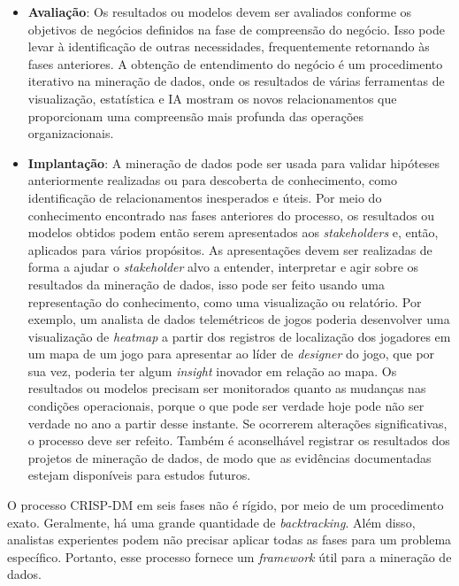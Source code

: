 \begin{itemize}
  \item
\textbf{Avaliação}: Os resultados ou modelos devem ser avaliados conforme os objetivos de negócios definidos na fase de compreensão do negócio. Isso pode levar à identificação de outras necessidades, frequentemente retornando às fases anteriores. A obtenção de entendimento do negócio é um procedimento iterativo na mineração de dados, onde os resultados de várias ferramentas de visualização, estatística e IA mostram os novos relacionamentos que proporcionam uma compreensão mais profunda das operações organizacionais.
  \item
\textbf{Implantação}: A mineração de dados pode ser usada para validar hipóteses anteriormente realizadas ou para descoberta de conhecimento, como identificação de relacionamentos inesperados e úteis. Por meio do conhecimento encontrado nas fases anteriores do processo, os resultados ou modelos obtidos podem então serem apresentados aos \textit{stakeholders} e, então, aplicados para vários propósitos. As apresentações devem ser realizadas de forma a ajudar o \textit{stakeholder} alvo a entender, interpretar e agir sobre os resultados da mineração de dados, isso pode ser feito usando uma representação do conhecimento, como uma visualização ou relatório. Por exemplo, um analista de dados telemétricos de jogos poderia desenvolver uma visualização de \textit{heatmap} a partir dos registros de localização dos jogadores em um mapa de um jogo para apresentar ao líder de \textit{designer} do jogo, que por sua vez, poderia ter algum \textit{insight} inovador em relação ao mapa. Os resultados ou modelos precisam ser monitorados quanto as mudanças nas condições operacionais, porque o que pode ser verdade hoje pode não ser verdade no ano a partir desse instante. Se ocorrerem alterações significativas, o processo deve ser refeito. Também é aconselhável registrar os resultados dos projetos de mineração de dados, de modo que as evidências documentadas estejam disponíveis para estudos futuros.

\end{itemize}
O processo CRISP-DM em seis fases não é rígido, por meio de um procedimento exato. Geralmente, há uma grande quantidade de \textit{backtracking}. Além disso, analistas experientes podem não precisar aplicar todas as fases para um problema específico. Portanto, esse processo fornece um \textit{framework} útil para a mineração de dados.

